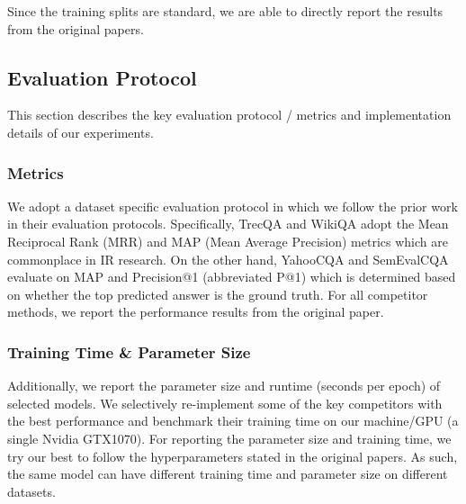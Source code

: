 \documentclass[sigconf]{acmart}
\begin{document}
Since the training splits are standard, we are able to directly report the results from the original papers. 





\subsection{Evaluation Protocol}
This section describes the key evaluation protocol / metrics and implementation details of our experiments. 
\subsubsection{Metrics}
We adopt a dataset specific evaluation protocol in which we follow the prior work in their evaluation protocols. Specifically, TrecQA and WikiQA adopt the Mean Reciprocal Rank (MRR) and MAP (Mean Average Precision) metrics which are commonplace in IR research. On the other hand, YahooCQA and SemEvalCQA evaluate on MAP and Precision@1 (abbreviated P@1) which is determined based on whether the top predicted answer is the ground truth. For all competitor methods, we report the performance results from the original paper. 

\subsubsection{Training Time \& Parameter Size}
Additionally, we report the parameter size and runtime (seconds per epoch) of selected models.  We selectively re-implement some of the key competitors with the best performance and benchmark their training time on our machine/GPU (a single Nvidia GTX1070). For reporting the parameter size and training time, we try our best to follow the hyperparameters stated in the original papers. As such, the same model can have different training time and parameter size on different datasets. 
\end{document}
